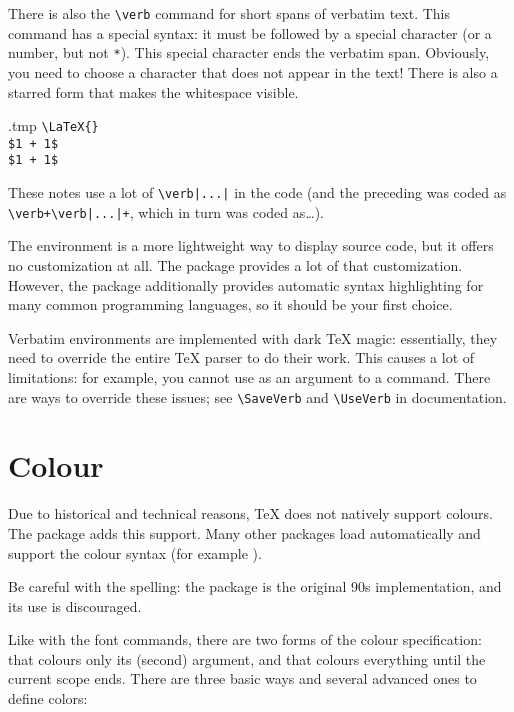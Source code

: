 There is also the \verb|\verb| command for short spans of verbatim text.
This command has a special syntax:
it must be followed by a special character (or a number, but not \verb|*|).
This special character ends the verbatim span.
Obviously, you need to choose a character that does not appear in the text!
There is also a starred form that makes the whitespace visible.

\begin{VerbatimOut}{\jobname.tmp}
\verb+\LaTeX{}+ \\
\verb|$1 + 1$| \\
\verb*|$1 + 1$|
\end{VerbatimOut}
\ShowExample
%
These notes use a lot of \verb+\verb|...|+ in the code
(and the preceding was coded as
\verb!\verb+\verb|...|+!, which in turn was coded as\dots).

The  environment is a more lightweight way to display source code,
but it offers no customization at all.
The  package provides a lot of that customization.
However, the  package additionally provides automatic syntax highlighting
for many common programming languages, so it should be your first choice.

\begin{technote}
Verbatim environments are implemented with dark \TeX{} magic:
essentially, they need to override the entire \TeX{} parser to do their work.
This causes a lot of limitations:
for example, you cannot use  as an argument to a command.
There are ways to override these issues;
see \verb|\SaveVerb| and \verb|\UseVerb| in  documentation.
\end{technote}


%
%
%
\section{Colour}\label{sec:colour}

Due to historical and technical reasons, \TeX{} does not natively support colours.
The  package adds this support.
Many other packages load  automatically
and support the colour syntax (for example ).

\begin{gotcha}
Be careful with the spelling: the  package is the original 90s implementation,
and its use is discouraged.
\end{gotcha}

Like with the font commands, there are two forms of the colour specification:
 that colours only its (second) argument,
and  that colours everything until the current scope ends.
There are three basic ways and several advanced ones to define colors:

